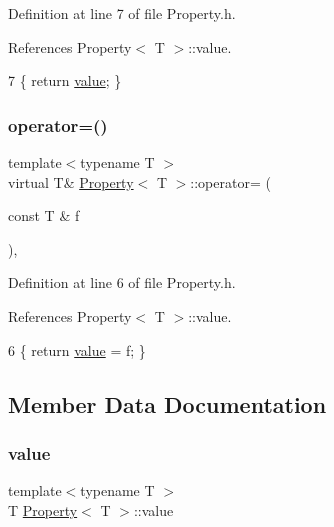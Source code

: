 Definition at line 7 of file Property.\+h.



References Property$<$ T $>$\+::value.


\begin{DoxyCode}
7 \{ \textcolor{keywordflow}{return} \mbox{\hyperlink{classProperty_a2be7b50eb1b49c6fbbb434de219e51fd}{value}}; \}
\end{DoxyCode}
\mbox{\label{classProperty_a5544ed373da5ea5aee46217ebed97eb7}} 
\subsubsection{\texorpdfstring{operator=()}{operator=()}}
{\footnotesize\ttfamily template$<$typename T $>$ \\
virtual T\& \mbox{\hyperlink{classProperty}{Property}}$<$ T $>$\+::operator= (\begin{DoxyParamCaption}\item[{const T \&}]{f }\end{DoxyParamCaption})\hspace{0.3cm}{\ttfamily [inline]}, {\ttfamily [virtual]}}



Definition at line 6 of file Property.\+h.



References Property$<$ T $>$\+::value.


\begin{DoxyCode}
6 \{ \textcolor{keywordflow}{return} \mbox{\hyperlink{classProperty_a2be7b50eb1b49c6fbbb434de219e51fd}{value}} = f; \}
\end{DoxyCode}


\subsection{Member Data Documentation}
\mbox{\label{classProperty_a2be7b50eb1b49c6fbbb434de219e51fd}} 
\subsubsection{\texorpdfstring{value}{value}}
{\footnotesize\ttfamily template$<$typename T $>$ \\
T \mbox{\hyperlink{classProperty}{Property}}$<$ T $>$\+::value\hspace{0.3cm}{\ttfamily [protected]}}



